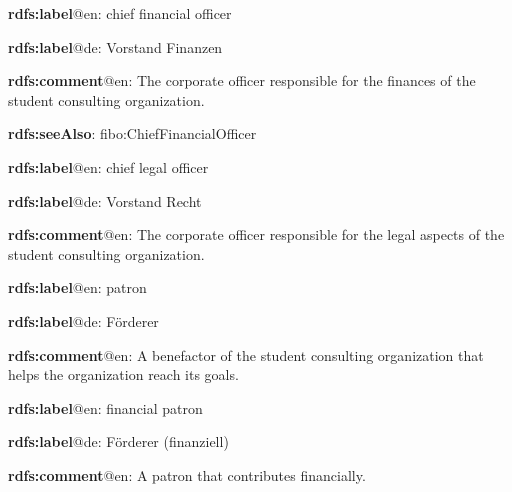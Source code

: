 \documentclass[a4paper, DIV=13, BCOR=0cm]{scrbook}
\begin{document}
\begin{mdframed}[style=onto-3, frametitle={Chief\_Financial\_Officer}]
	{%
		\begin{compactitem}
			\item \textbf{rdfs:label}@en: chief financial officer
			\item \textbf{rdfs:label}@de: Vorstand Finanzen
			\item \textbf{rdfs:comment}@en: The corporate officer responsible for the finances of the student consulting organization.
			\item \textbf{rdfs:seeAlso}: fibo:ChiefFinancialOfficer
		\end{compactitem}
	} %
\end{mdframed}

\begin{mdframed}[style=onto-3, frametitle={Chief\_Legal\_Officer}]
	{%
		\begin{compactitem}
			\item \textbf{rdfs:label}@en: chief legal officer
			\item \textbf{rdfs:label}@de: Vorstand Recht
			\item \textbf{rdfs:comment}@en: The corporate officer responsible for the legal aspects of the student consulting organization.
		\end{compactitem}
	} %
\end{mdframed}

\begin{mdframed}[style=onto-2, frametitle={Patron}]
	{%
		\begin{compactitem}
			\item \textbf{rdfs:label}@en: patron
			\item \textbf{rdfs:label}@de: Förderer
			\item \textbf{rdfs:comment}@en: A benefactor of the student consulting organization that helps the organization reach its goals.
		\end{compactitem}
	} %
\end{mdframed}

\begin{mdframed}[style=onto-3, frametitle={Financial\_Patron}]
	{%
		\begin{compactitem}
			\item \textbf{rdfs:label}@en: financial patron
			\item \textbf{rdfs:label}@de:  Förderer (finanziell)
			\item \textbf{rdfs:comment}@en: A patron that contributes financially.
		\end{compactitem}
	} %
\end{mdframed}
\end{document}
